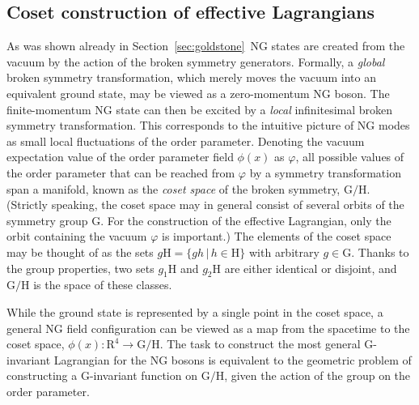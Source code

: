 \documentclass[final,2p,times,12pt,sort&compress]{elsarticle}
\newcommand\gr[1]{\mathrm{#1}}              %
\newcommand\vp{\varphi}
\begin{document}
\subsection{Coset construction of effective Lagrangians}
As was shown already in Section~\ref{sec:goldstone}\ NG states are created
from the vacuum by the action of the broken symmetry generators. Formally, a
\emph{global} broken symmetry transformation, which merely moves the vacuum
into an equivalent ground state, may be viewed as a zero-momentum NG boson. The
finite-momentum NG state can then be excited by a \emph{local} infinitesimal
broken symmetry transformation. This corresponds to the intuitive picture of NG
modes as small local fluctuations of the order parameter. Denoting the vacuum
expectation value of the order parameter field $\phi(x)$ as $\vp$, all possible
values of the order parameter that can be reached from $\vp$ by a symmetry
transformation span a manifold, known as the \emph{coset space} of the
broken symmetry, $\gr{G/H}$. (Strictly speaking, the coset space may in general
consist of several orbits of the symmetry group $\gr G$. For the construction
of the effective Lagrangian, only the orbit containing the vacuum $\vp$ is
important.) The elements of the coset space may be thought of as the sets $g\gr
H=\{gh\,|\,h\in\gr H\}$ with arbitrary $g\in\gr G$. Thanks to the group
properties, two sets $g_1\gr H$ and $g_2\gr H$ are either identical or disjoint,
and $\gr{G/H}$ is the space of these classes.

While the ground state is represented by a single point in the coset space, a
general NG field configuration can be viewed as a map from the spacetime to the
coset space, $\phi(x):\gr{R^4}\to\gr{G/H}$. The task to construct the most
general $\gr G$-invariant Lagrangian for the NG bosons is equivalent to the
geometric problem of constructing a $\gr G$-invariant function on $\gr{G/H}$,
given the action of the group on the order parameter.
\end{document}
